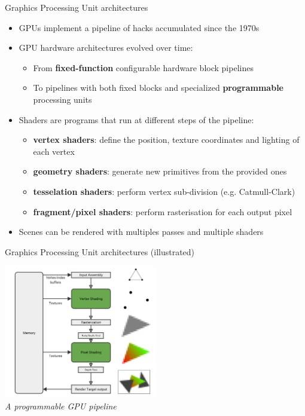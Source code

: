 \begin{frame}{Graphics Processing Unit architectures}
  \begin{itemize}
  \item GPUs implement a pipeline of hacks accumulated since the 1970s
  \item GPU hardware architectures evolved over time:
    \begin{itemize}
    \item From \textbf{fixed-function} configurable hardware block pipelines
    \item To pipelines with both fixed blocks and specialized \textbf{programmable} processing units
    \end{itemize}
  \item Shaders are programs that run at different steps of the pipeline:
    \begin{itemize}
    \item \textbf{vertex shaders}: define the position, texture coordinates and lighting of each vertex
    \item \textbf{geometry shaders}: generate new primitives from the provided ones
    \item \textbf{tesselation shaders}: perform vertex sub-division (e.g. Catmull-Clark)
    \item \textbf{fragment/pixel shaders}: perform rasterisation for each output pixel
    \end{itemize}
  \item Scenes can be rendered with multiples passes and multiple shaders
  \end{itemize}
\end{frame}

\begin{frame}{Graphics Processing Unit architectures (illustrated)}
  \begin{center}
  \includegraphics[width=0.5\textwidth]{slides/graphics-hardware/gpu-pipeline.png}\\
  \textit{\small A programmable GPU pipeline}
  \end{center}
\end{frame}

